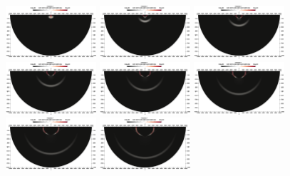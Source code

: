 \begin{figure}
    \centering
    \includegraphics[width=0.3\textwidth]{./Images/t1-large.png}        \includegraphics[width=0.3\textwidth]{./Images/t2-large.png}    
    \includegraphics[width=0.3\textwidth]{./Images/t3-large.png}\\
    \includegraphics[width=0.3\textwidth]{./Images/t5-large.png}        \includegraphics[width=0.3\textwidth]{./Images/t6-large.png}    
    \includegraphics[width=0.3\textwidth]{./Images/t7-large.png}\\
    \includegraphics[width=0.3\textwidth]{./Images/t8-large.png}        \includegraphics[width=0.3\textwidth]{./Images/t9-large.png}    

\end{figure}
